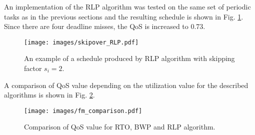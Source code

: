 An implementation of the RLP algorithm was tested on the same set of periodic tasks as in the previous sections and the resulting schedule is shown in Fig. 
\ref{rlp_schedule}.
Since there are four deadline misses, the QoS is increased to 0.73.

\begin{figure}[ht]
    \centering
    \texttt{[image: images/skipover\_RLP.pdf]}
    \caption{An example of a schedule produced by RLP algorithm with skipping factor $s_i=2$.}
    \label{rlp_schedule}
\end{figure}

A comparison of QoS value depending on the utilization value for the described algorithms is shown in Fig. \ref{fm_comparison}.

\begin{figure}[ht]
    \centering
    \texttt{[image: images/fm\_comparison.pdf]}
    \caption{Comparison of QoS value for RTO, BWP and RLP algorithm.}
    \label{fm_comparison}
\end{figure}






